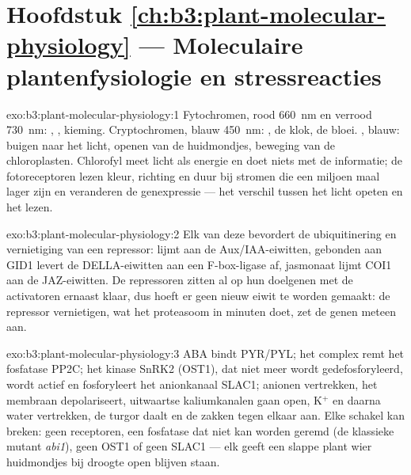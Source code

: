 \section*{Hoofdstuk \ref{ch:b3:plant-molecular-physiology} --- Moleculaire plantenfysiologie en stressreacties}

\begin{solution}{exo:b3:plant-molecular-physiology:1}
Fytochromen, rood \qty{660}{nm} en verrood \qty{730}{nm}:
, , kieming. Cryptochromen, blauw
\qty{450}{nm}: , de klok, de bloei. , blauw:
buigen naar het licht, openen van de huidmondjes, beweging van de
chloroplasten. Chlorofyl meet licht als energie en doet niets met de
informatie; de fotoreceptoren lezen kleur, richting en duur bij stromen
die een miljoen maal lager zijn en veranderen de genexpressie --- het
verschil tussen het licht opeten en het lezen.
\end{solution}

\begin{solution}{exo:b3:plant-molecular-physiology:2}
Elk van deze  bevordert de ubiquitinering en vernietiging van
een repressor:  lijmt  aan de Aux/IAA-eiwitten, 
gebonden aan GID1 levert de DELLA-eiwitten aan een F-box-ligase af,
jasmonaat lijmt COI1 aan de JAZ-eiwitten. De repressoren zitten al op
hun doelgenen met de activatoren ernaast klaar, dus hoeft er geen nieuw
eiwit te worden gemaakt: de repressor vernietigen, wat het proteasoom
in minuten doet, zet de genen meteen aan.
\end{solution}

\begin{solution}{exo:b3:plant-molecular-physiology:3}
ABA bindt PYR/PYL; het complex remt het fosfatase PP2C; het kinase
SnRK2 (OST1), dat niet meer wordt gedefosforyleerd, wordt actief en
fosforyleert het anionkanaal SLAC1; anionen vertrekken, het membraan
depolariseert, uitwaartse kaliumkanalen gaan open, K$^{+}$ en daarna
water vertrekken, de turgor daalt en de  zakken tegen elkaar
aan. Elke schakel kan breken: geen receptoren, een fosfatase dat niet
kan worden geremd (de klassieke mutant \emph{abi1}), geen OST1 of geen
SLAC1 --- elk geeft een slappe plant wier huidmondjes bij droogte open
blijven staan.
\end{solution}

